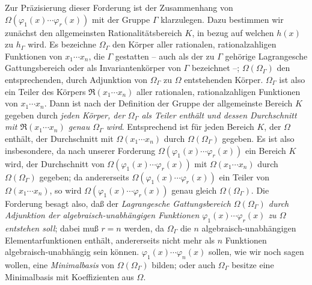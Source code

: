 Zur Präzisierung dieser Forderung ist der Zusammenhang von $\Omega(\varphi_1(x)\cdots\varphi_r(x))$ mit der Gruppe $\Gamma$ klarzulegen. Dazu bestimmen wir zunächst den allgemeinsten Rationalitätsbereich $K$, in bezug auf welchen $h(x)$ zu $h_\Gamma$ wird. Es bezeichne $\Omega_\Gamma$ den Körper aller rationalen, rationalzahligen Funktionen von $x_1\cdots x_n$, die $\Gamma$ gestatten -- auch als der zu $\Gamma$ gehörige \glqq{}Lagrangesche Gattungsbereich\grqq{} oder als Invariantenkörper von $\Gamma$ bezeichnet --; $\Omega(\Omega_\Gamma)$ den entsprechenden, durch Adjunktion von $\Omega_\Gamma$ zu $\Omega$ entstehenden Körper. $\Omega_\Gamma$ ist also ein Teiler des Körpers $\mathfrak R(x_1\cdots x_n)$ aller rationalen, rationalzahligen Funktionen von $x_1\cdots x_n$. Dann ist nach der Definition der Gruppe der allgemeinste Bereich $K$ gegeben durch \emph{jeden Körper, der $\Omega_\Gamma$ als Teiler enthält und dessen Durchschnitt mit $\mathfrak R(x_1\cdots x_n)$ genau $\Omega_\Gamma$ wird}. Entsprechend ist für jeden Bereich $K$, der $\Omega$ enthält, der Durchschnitt mit $\Omega(x_1\cdots x_n)$ durch $\Omega(\Omega_\Gamma)$ gegeben. Es ist also insbesondere, da nach unserer Forderung $\Omega(\varphi_1(x)\cdots\varphi_r(x))$ ein Bereich $K$ wird, der Durchschnitt von $\Omega(\varphi_1(x)\cdots\varphi_r(x))$ mit $\Omega(x_1\cdots x_n)$ durch $\Omega(\Omega_\Gamma)$ gegeben; da andererseits $\Omega(\varphi_1(x)\cdots\varphi_r(x))$ ein Teiler von $\Omega(x_1\cdots x_n)$, so wird $\Omega(\varphi_1(x)\cdots\varphi_r(x))$ genau gleich $\Omega(\Omega_\Gamma)$. Die Forderung besagt also, daß der \emph{Lagrangesche Gattungsbereich $\Omega(\Omega_\Gamma)$ durch Adjunktion der algebraisch-unabhängigen Funktionen $\varphi_1(x)\cdots\varphi_r(x)$ zu $\Omega$ entstehen soll}; dabei muß $r=n$ werden, da $\Omega_\Gamma$ die $n$ algebraisch-unabhängigen Elementarfunktionen enthält, andererseits nicht mehr als $n$ Funktionen algebraisch-unabhängig sein können. $\varphi_1(x)\cdots\varphi_n(x)$ sollen, wie wir noch sagen wollen, eine \emph{Minimalbasis} von $\Omega(\Omega_\Gamma)$ bilden; oder auch $\Omega_\Gamma$ besitze eine Minimalbasis mit Koeffizienten aus $\Omega$.

